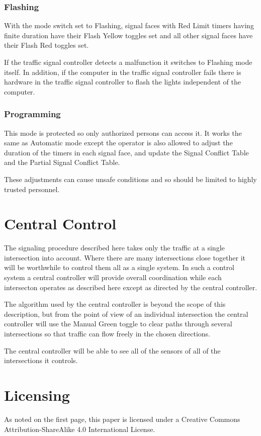 \documentclass[letterpaper,twoside]{article}
\begin{document}
\subsubsection{Flashing}

With the mode switch set to Flashing, signal faces with Red Limit
timers having finite duration have their Flash Yellow toggles set
and all other signal faces have their Flash Red toggles set.

If the traffic signal controller detects a malfunction it switches
to Flashing mode itself.  In addition, if the computer in the traffic
signal controller fails there is hardware in the traffic signal
controller to flash the lights independent of the computer.

\subsubsection{Programming}

This mode is protected so only authorized persons can access it.
It works the same as Automatic mode except the operator is also allowed to
adjust the duration of the timers in each signal face, and update the
Signal Conflict Table and the Partial Signal Conflict Table.

These adjustments can cause unsafe conditions and so should be limited
to highly trusted personnel.

\section{Central Control}

The signaling procedure described here takes only the traffic at a single
intersection into account.  Where there are many intersections close
together it will be worthwhile to control them all as a single system.
In such a control system a central controller will provide overall
coordination while each intersecton operates as described here except as
directed by the central controller.

The algorithm used by the central controller is beyond the scope of this
description, but from the point of view of an individual intersection
the central controller will use the Manual Green toggle to clear paths
through several intersections so that traffic can flow freely in the
chosen directions.

The central controller will be able to see all of the sensors of all
of the intersections it controls.

\section{Licensing}
\label{section:Licensing}
As noted on the first page, this paper is licensed under a Creative
Commons Attribution-ShareAlike 4.0 International License.
\end{document}

